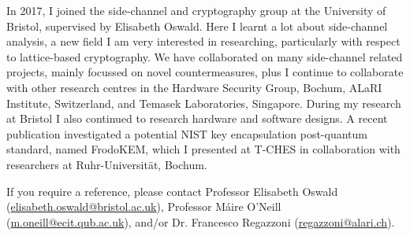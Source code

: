 \documentclass[10pt,a4paper]{moderncv}
\begin{document}
\vspace{0.25cm}

In 2017, I joined the side-channel and cryptography group at the University of Bristol, supervised by Elisabeth Oswald. Here I learnt a lot about side-channel analysis, a new field I am very interested in researching, particularly with respect to lattice-based cryptography. We have collaborated on many side-channel related projects, mainly focussed on novel countermeasures, plus I continue to collaborate with other research centres in the Hardware Security Group, Bochum, ALaRI Institute, Switzerland, and Temasek Laboratories, Singapore. During my research at Bristol I also continued to research hardware and software designs. A recent publication investigated a potential NIST key encapsulation post-quantum standard, named FrodoKEM, which I presented at T-CHES in collaboration with researchers at Ruhr-Universit\"{a}t, Bochum.

\vspace{0.25cm}



If you require a reference, please contact Professor Elisabeth Oswald (\url{elisabeth.oswald@bristol.ac.uk}), Professor M\'{a}ire O'Neill (\url{m.oneill@ecit.qub.ac.uk}), and/or Dr. Francesco Regazzoni (\url{regazzoni@alari.ch}). %




%

\end{document}
